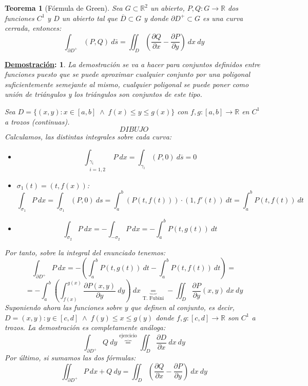 \documentclass[10pt,a4paper,openright]{book}
\theoremstyle{break}
\newtheorem*{theo}{Teorema}
\newtheorem*{demo}{\underline{Demostración}:}
\newcommand{\dif}[1]{\ d#1}
\begin{document}
\begin{theo}[Fórmula de Green]
Sea $G \subset \mathbb{R}^2$ un abierto, $P, Q: G \rightarrow \mathbb{R}$ dos funciones $C^1$ y $D$ un abierto tal que $\overline{D} \subset G$ y donde $\partial D^+ \subset G$ es una curva cerrada, entonces:
$$\int_{\partial D^+} (P, Q) \dif{\bar{s}} = \iint_{D} \left( \frac{\partial Q}{\partial x} - \frac{\partial P}{\partial y} \right) \dif{x} \dif{y}$$
\end{theo}
\begin{demo}
La demostración se va a hacer para conjuntos definidos entre funciones puesto que se puede aproximar cualquier conjunto por una poligonal suficientemente semejante al mismo, cualquier poligonal se puede poner como unión de triángulos y los triángulos son conjuntos de este tipo.

Sea $D = \{\left( x, y \right) : x \in \left[ a, b \right] \; \land \; f\left( x \right) \le y \le g\left( x \right) \}$ con $f, g: \left[ a, b \right] \rightarrow \mathbb{R}$ en $C^1$ a trozos (continuas).
$$DIBUJO$$
Calculamos, las distintas integrales sobre cada curva:
\begin{itemize}
\item  
$$\int_{\substack{\gamma_i\\ i = 1, 2}} P \dif{x} = \int_{\gamma_i} \left( P, 0 \right) \dif{\overline{s}} = 0$$
\item $\sigma_1 \left( t \right) = \left( t, f\left( x \right) \right)$: 
$$\int_{\sigma_1} P \dif{x} = \int_{\sigma_1} \left( P, 0 \right) \dif{s} = \int_{a}^{b} \left( P \left( t, f\left( t \right) \right) \right) \cdot \left( 1, f'\left( t \right) \right) \dif{t} = \int_{a}^{b} P\left( t, f\left( t \right) \right) \dif{t}$$
\item
$$\int_{\sigma_2} P \dif{x} = - \int_{-\sigma_2} P \dif{x} = - \int_{a}^{b} P\left( t, g\left( t \right) \right) \dif{t}$$
\end{itemize}
Por tanto, sobre la integral del enunciado tenemos: 
$$\int_{\partial D^+} P \dif{x} = - \left( \int_{a}^{b} P\left( t, g\left( t \right) \right) \dif{t} - \int_{a}^{b} P\left( t, f\left( t \right) \right) \dif{t} \right) = $$
$$= - \int_{a}^{b} \left( \int_{f\left( x \right)}^{g\left( x \right)} \frac{\partial P\left( x, y \right)}{\partial y} \dif{y} \right) \dif{x} \underbrace{=}_{\text{T. Fubini}} - \iint_{D} \frac{\partial P}{\partial y} \left( x, y \right) \dif{x} \dif{y}$$
Suponiendo ahora las funciones sobre $y$ que definen al conjunto, es decir, $D = \left( x, y \right) : y \in \left[ c, d \right] \; \land \; f\left( y \right) \le x \le g\left( y \right)$ donde $f, g: \left[ c, d \right] \rightarrow \mathbb{R}$ son $C^1$ a trozos. La demostración es completamente análoga: 
$$\int_{\partial D^+} Q \dif{y} \overbrace{=}^{\text{ejercicio}} \iint_{D} \frac{\partial D}{\partial x} \dif{x} \dif{y}$$
Por último, si sumamos las dos fórmulas: 
$$\iint_{\partial D^+} P \dif{x} + Q \dif{y} = \iint_{D} \left( \frac{\partial Q}{\partial x} - \frac{\partial P}{\partial y} \right) \dif{x} \dif{y}$$
\end{demo}
\end{document}
